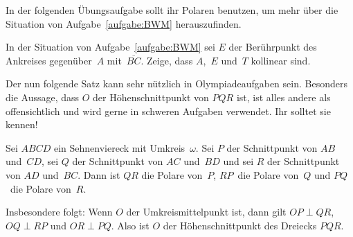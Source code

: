 In der folgenden Übungsaufgabe sollt ihr Polaren benutzen, um mehr über die Situation von Aufgabe~\ref{aufgabe:BWM} herauszufinden.

\begin{aufgabe*}\label{aufgabe:BWM2}
	In der Situation von Aufgabe~\ref{aufgabe:BWM} sei $E$ der Berührpunkt des Ankreises gegenüber~$A$ mit~$\overline{BC}$. Zeige, dass $A$,~$E$ und~$T$ kollinear sind.
\end{aufgabe*}

Der nun folgende Satz kann sehr nützlich in Olympiadeaufgaben sein. Besonders die Aussage, dass $O$ der Höhenschnittpunkt von $PQR$ ist, ist alles andere als offensichtlich und wird gerne in schweren Aufgaben verwendet. Ihr solltet sie kennen!

\begin{satzmitnamen}
	Sei $ABCD$ ein Sehnenviereck mit Umkreis~$\omega$. Sei $P$ der Schnittpunkt von $AB$ und~$CD$, sei $Q$ der Schnittpunkt von $AC$ und~$BD$ und sei $R$ der Schnittpunkt von $AD$ und~$BC$. Dann ist $QR$ die Polare von~$P$, $RP$~die Polare von~$Q$ und $PQ$~die Polare von~$R$.
	
	Insbesondere folgt: Wenn $O$ der Umkreismittelpunkt ist, dann gilt $OP\perp QR$, $OQ\perp RP$ und $OR\perp PQ$. Also ist $O$ der Höhenschnittpunkt des Dreiecks $PQR$.
\end{satzmitnamen}

